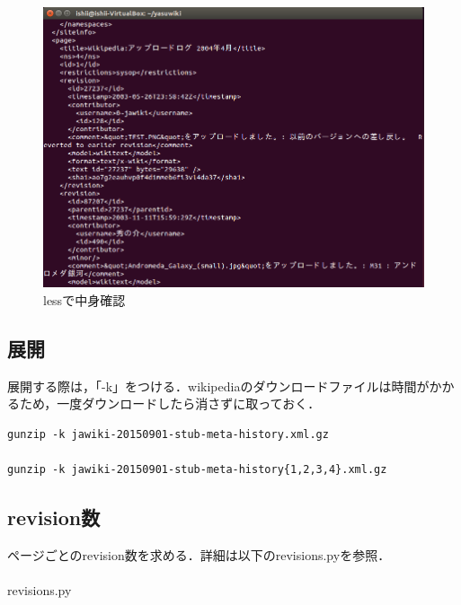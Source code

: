 \begin{figure}[H]
\centering
\includegraphics[width=12cm]{jawiki_contents.png}
\caption{lessで中身確認}\label{サンプル図}
\end{figure}


\subsection{展開}

展開する際は，「-k」をつける．wikipediaのダウンロードファイルは時間がかかるため，一度ダウンロードしたら消さずに取っておく．

{\small
\begin{verbatim}
gunzip -k jawiki-20150901-stub-meta-history.xml.gz

gunzip -k jawiki-20150901-stub-meta-history{1,2,3,4}.xml.gz
\end{verbatim}}



\subsection{revision数}

ページごとのrevision数を求める．詳細は以下のrevisions.pyを参照． \\
\\
revisions.py

